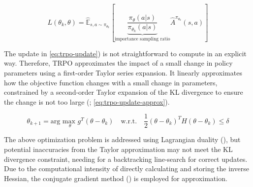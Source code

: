 \begin{equation}
    L(\theta_k, \theta) = \mathbb{\hat{E}}_{s, a \sim \pi_{\theta_k}} \left [ \underbrace{\frac{\pi_{\theta}(a | s)}{\pi_{\theta_k}(a | s)}}_{\text{importance sampling ratio}} \hat{A}^{\pi_{\theta_k}}(s, a)\right]
    \label{eq:surrogate-advantage}
\end{equation}

\noindent The update in \textcolor{deepblue}{\autoref{eq:trpo-update}}) is not straightforward to compute in an explicit way. Therefore, TRPO approximates the impact of a small change in policy parameters using a first-order Taylor series expansion. It linearly approximates how the objective function changes with a small change in parameters, constrained by a second-order Taylor expansion of the KL divergence to ensure the change is not too large (\textcolor{deepblue}{\cite{schulman2017trust}; \autoref{eq:trpo-update-approx}}).

\begin{equation}
    \theta_{k+1} = \text{arg }\underset{\theta}{\text{max }} g^T(\theta - \theta_k) \quad \text{w.r.t.} \quad \frac{1}{2}(\theta - \theta_k)^T H(\theta - \theta_k) \leq \delta
    \label{eq:trpo-update-approx}
\end{equation}

\noindent The above optimization problem is addressed using Lagrangian duality (\cite{KnowlesLagrangianDuality}), but potential inaccuracies from the Taylor approximation may not meet the KL divergence constraint, needing for a backtracking line-search for correct updates. Due to the computational intensity of directly calculating and storing the inverse Hessian, the conjugate gradient method (\cite{conjugate}) is employed for approximation.

